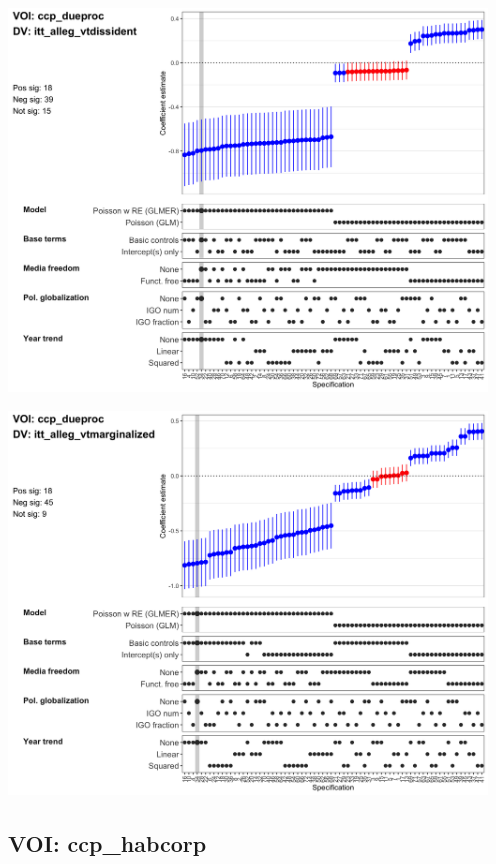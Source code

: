 \documentclass[]{article}
\begin{document}
\includegraphics[height=4in]{../output/figures-robustness/specplot-ccp_dueproc-itt_alleg_vtdissident.png}

\includegraphics[height=4in]{../output/figures-robustness/specplot-ccp_dueproc-itt_alleg_vtmarginalized.png}

\hypertarget{voi-ccp_habcorp}{%
\subsection{VOI: ccp\_habcorp}\label{voi-ccp_habcorp}}
\end{document}

